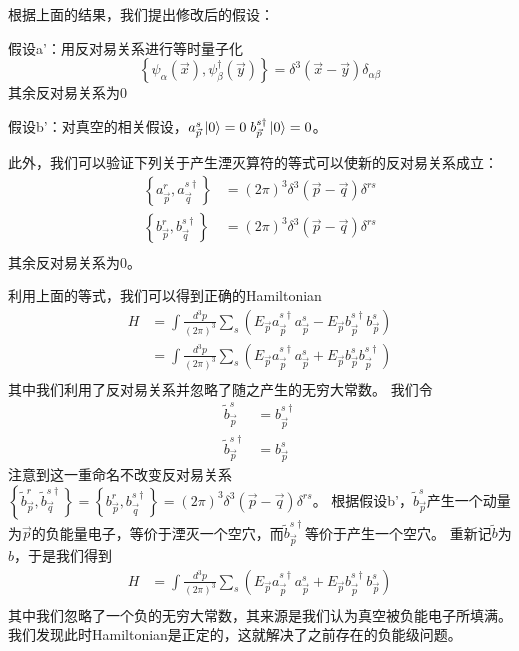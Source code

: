 根据上面的结果，我们提出修改后的假设：

假设a'：用反对易关系进行等时量子化
\begin{equation}
     \left\{\psi_{\alpha}(\vec{x}),\psi_{\beta}^{\dagger}(\vec{y})\right\}=\delta^{3}(\vec{x}-\vec{y})\delta_{\alpha\beta}
\end{equation}
其余反对易关系为0

假设b'：对真空的相关假设，$a_{\vec{p}}^{s}\ket{0}=0\;b_{\vec{p}}^{s\dagger}\ket{0}=0$。

此外，我们可以验证下列关于产生湮灭算符的等式可以使新的反对易关系成立：
\begin{equation}
    \begin{aligned}
    \left\{a^{r}_{\vec{p}},a^{s\dagger}_{\vec{q}}\right\}&=(2\pi)^{3}\delta^{3}(\vec{p}-\vec{q})\delta^{rs}\\
        \left\{b^{r}_{\vec{p}},b^{s\dagger}_{\vec{q}}\right\}&=(2\pi)^{3}\delta^{3}(\vec{p}-\vec{q})\delta^{rs}\\
    \end{aligned}
\end{equation}
其余反对易关系为0。

利用上面的等式，我们可以得到正确的Hamiltonian
    \begin{equation}
    \begin{aligned}
    H&=\int \frac{d^{3}p}{(2\pi)^{3}}\sum\limits_{s}\left(E_{\vec{p}}a^{s\dagger}_{\vec{p}}a^{s}_{\vec{p}}-E_{\vec{p}}b^{s\dagger}_{\vec{p}}b^{s}_{\vec{p}}\right)\\
    &=\int \frac{d^{3}p}{(2\pi)^{3}}\sum\limits_{s}\left(E_{\vec{p}}a^{s\dagger}_{\vec{p}}a^{s}_{\vec{p}}+E_{\vec{p}}b^{s}_{\vec{p}}b^{s\dagger}_{\vec{p}}\right)\\
    \end{aligned}
\end{equation}
其中我们利用了反对易关系并忽略了随之产生的无穷大常数。
我们令
\begin{equation}
\begin{aligned}
\tilde{b}_{\vec{p}}^{s}&= b_{\vec{p}}^{s\dagger}\\
\tilde{b}_{\vec{p}}^{s\dagger}&= b_{\vec{p}}^{s}
\end{aligned}    
\end{equation}
注意到这一重命名不改变反对易关系$\left\{\tilde{b}^{r}_{\vec{p}},\tilde{b}^{s\dagger}_{\vec{q}}\right\}=\left\{b^{r}_{\vec{p}},b^{s\dagger}_{\vec{q}}\right\}=(2\pi)^{3}\delta^{3}(\vec{p}-\vec{q})\delta^{rs}$。
根据假设b'，$\tilde{b}_{\vec{p}}^{s}$产生一个动量为$\vec{p}$的负能量电子，等价于湮灭一个空穴，而$\tilde{b}_{\vec{p}}^{s\dagger}$等价于产生一个空穴。
重新记$\tilde{b}$为$b$，于是我们得到
 \begin{equation}
    \begin{aligned}
    H&=\int \frac{d^{3}p}{(2\pi)^{3}}\sum\limits_{s}\left(E_{\vec{p}}a^{s\dagger}_{\vec{p}}a^{s}_{\vec{p}}+E_{\vec{p}}b^{s\dagger}_{\vec{p}}b^{s}_{\vec{p}}\right)\\
    \end{aligned}
\end{equation}
其中我们忽略了一个负的无穷大常数，其来源是我们认为真空被负能电子所填满。我们发现此时Hamiltonian是正定的，这就解决了之前存在的负能级问题。

